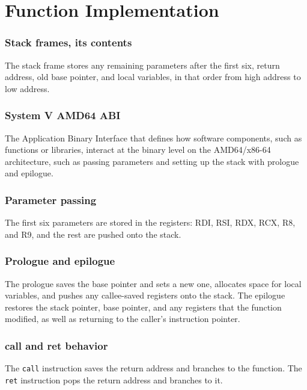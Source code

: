 \documentclass{article}
\newcommand{\inlinecode}[1]{\colorbox{gray!20}{\texttt{#1}}}
\begin{document}
\section*{Function Implementation}

\subsubsection*{Stack frames, its contents}

The stack frame stores any remaining parameters after the first six, return address, old base pointer, and local variables, in that order from high address to low address.

\subsubsection*{System V AMD64 ABI}

The Application Binary Interface that defines how software components, such as functions or libraries, interact at the binary level on the AMD64/x86-64 architecture, such as passing parameters and setting up the stack with prologue and epilogue.

\subsubsection*{Parameter passing}

The first six parameters are stored in the registers: RDI, RSI, RDX, RCX, R8, and R9, and the rest are pushed onto the stack.

\subsubsection*{Prologue and epilogue}

The prologue saves the base pointer and sets a new one, allocates space for local variables, and pushes any callee-saved registers onto the stack. The epilogue restores the stack pointer, base pointer, and any registers that the function modified, as well as returning to the caller's instruction pointer.

\subsubsection*{call and ret behavior}

The \inlinecode{call} instruction saves the return address and branches to the function. The \inlinecode{ret} instruction pops the return address and branches to it.
\end{document}
